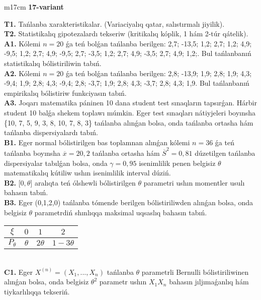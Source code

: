 \documentclass{article}
\begin{document}
\vspace{1cm}


\begin{tabular}{m{17cm}}
\textbf{17-variant}
\newline

\textbf{T1.} 
Tańlanba xarakteristikalar. (Variaciyalıq qatar, salıstırmalı jiyilik).
 \\
\textbf{T2.} 
Statistikalıq gipotezalardı tekseriw (kritikalıq kóplik, 1 hám 2-túr qátelik).
 \\
\textbf{A1.} 
Kólemi \(n = 20\) ǵa teń bolǵan tańlanba berilgen: 2,7; -13,5; 1,2; 2,7; 1,2; 4,9; -9,5; 1,2; 2,7; 4,9; -9,5; 2,7; -3,5; 1,2; 2,7; 4,9; -3,5; 2,7; 4,9; 1,2;. Bul tańlanbanıń statistikalıq bólistiriliwin tabıń.
 \\
\textbf{A2.} 
Kólemi \(n = 20\) ǵa teń bolǵan tańlanba berilgen: 2,8; -13,9; 1,9; 2,8; 1,9; 4,3; -9,4; 1,9; 2,8; 4,3; -9,4; 2,8; -3,7; 1,9; 2,8; 4,3; -3,7; 2,8; 4,3; 1,9. Bul tańlanbanıń empirikalıq bólistiriw funkciyasın tabıń.
 \\
\textbf{A3.} 
Joqarı matematika páninen 10 dana student test sınaqların tapsırǵan. Hárbir student 10 balǵa shekem toplawı múmkin. Eger test sınaqları nátiyjeleri boyınsha \{10, 7, 5, 9, 3, 8, 10, 7, 8, 3\} tańlanba alınǵan bolsa, onda tańlanba ortasha hám tańlanba dispersiyalardı tabıń.
 \\
\textbf{B1.} 
Eger normal bólistirilgen bas toplamnan alınǵan kólemi \(n = 36\) ǵa teń tańlanba boyınsha \(\overline{x} = 20,2\) tańlanba ortasha hám \({\overline{S}}^{2} = 0,81\) dúzetilgen tańlanba dispersiyalar tabılǵan bolsa, onda \(\gamma = 0,95\) isenimlilik penen belgisiz \(\theta\) matematikalıq kútiliw ushın isenimlilik interval dúziń.
 \\
\textbf{B2.} 
\(\lbrack 0,\theta\rbrack\) aralıqta teń ólshewli bólistirilgen \(\theta\) parametri ushın momentler usulı bahasın tabıń.
 \\
\textbf{B3.} 
Eger (0,1,2,0) tańlanba tómende berilgen bólistiriliwden alınǵan bolsa, onda belgisiz \(\theta\) parametrdiń shınlıqqa maksimal uqsaslıq bahasın tabıń.
\begin{tabular}{|c|c|c|c|}
  \hline
$\xi$
&
$0$
&
$1$
&
$2$\\
\hline
\(P_{\theta}\) & \(\theta\) & \(2\theta\) & \(1 - 3\theta\) \\
\hline
\end{tabular}
 \\
\textbf{C1.} 
Eger \(X^{(n)} = \left( X_{1},...,X_{n} \right)\) tańlanba \(\theta\) parametrli Bernulli bólistiriliwinen alınǵan bolsa, onda belgisiz \(\theta^{2}\) parametr ushın \(X_{1}X_{n}\) bahasın jıljımaǵanlıq hám tiykarlılıqqa tekseriń.

\end{tabular}
\end{document}
